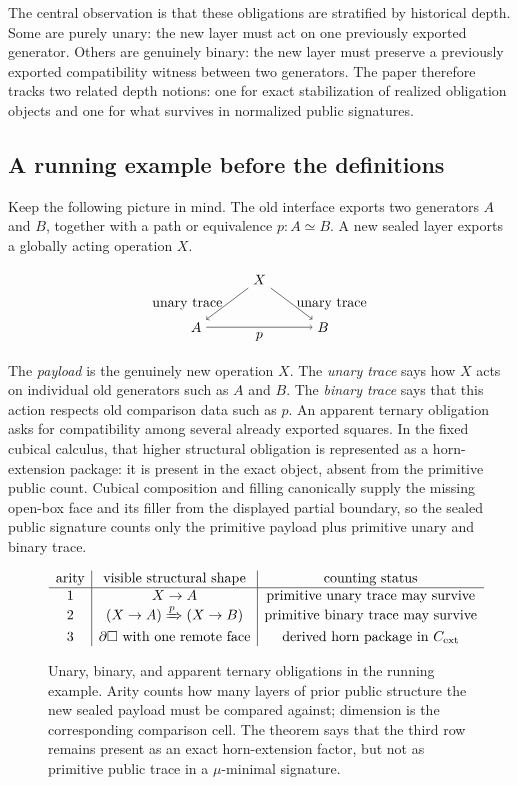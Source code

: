 \documentclass{lmcs}
\newcommand{\Cext}{C_{\mathrm{ext}}}
\begin{document}
The central observation is that these obligations are stratified by historical depth. Some are purely unary: the new layer must act on one previously exported generator. Others are genuinely binary: the new layer must preserve a previously exported compatibility witness between two generators. The paper therefore tracks two related depth notions: one for exact stabilization of realized obligation objects and one for what survives in normalized public signatures.

\subsection{A running example before the definitions}
\label{subsec:running-example}

Keep the following picture in mind. The old interface exports two generators $A$ and $B$, together with a path or equivalence $p:A\simeq B$. A new sealed layer exports a globally acting operation $X$.

\[
\begin{tikzpicture}[baseline=(x.base)]
  \node (x) at (0,0) {$X$};
  \node (a) at (-1.6,-1.2) {$A$};
  \node (b) at (1.6,-1.2) {$B$};
  \draw[->] (x) -- node[left] {unary trace} (a);
  \draw[->] (x) -- node[right] {unary trace} (b);
  \draw[->] (a) -- node[below] {$p$} (b);
\end{tikzpicture}
\]

The \emph{payload} is the genuinely new operation $X$. The \emph{unary trace} says how $X$ acts on individual old generators such as $A$ and $B$. The \emph{binary trace} says that this action respects old comparison data such as $p$. An apparent ternary obligation asks for compatibility among several already exported squares. In the fixed cubical calculus, that higher structural obligation is represented as a horn-extension package: it is present in the exact object, absent from the primitive public count. Cubical composition and filling canonically supply the missing open-box face and its filler from the displayed partial boundary, so the sealed public signature counts only the primitive payload plus primitive unary and binary trace.

\begin{figure}[t]
\centering
\[
\begin{array}{c|c|c}
\text{arity} & \text{visible structural shape} & \text{counting status} \\
\hline
1 & X\to A & \text{primitive unary trace may survive} \\
2 & (X\to A)\xRightarrow{p}(X\to B) & \text{primitive binary trace may survive} \\
3 & \partial\Box\ \text{with one remote face} & \text{derived horn package in }\Cext
\end{array}
\]
\caption{Unary, binary, and apparent ternary obligations in the running example. Arity counts how many layers of prior public structure the new sealed payload must be compared against; dimension is the corresponding comparison cell. The theorem says that the third row remains present as an exact horn-extension factor, but not as primitive public trace in a $\mu$-minimal signature.}
\label{fig:arity-obligations}
\end{figure}
\end{document}
